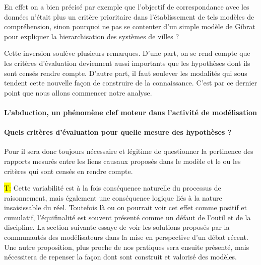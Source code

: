 En effet on a bien précisé par exemple que l'objectif de correspondance avec les données n'était plus un critère prioritaire dans l'établissement de tels modèles de compréhension, sinon pourquoi ne pas se contenter d'un simple modèle de Gibrat pour expliquer la hierarchisation des systèmes de villes ? 


Cette inversion soulève plusieurs remarques. D'une part, on se rend compte que les critères d'évaluation deviennent aussi importants que les hypothèses dont ils sont censés rendre compte. D'autre part, il faut soulever les modalités qui sous tendent cette nouvelle façon de construire de la connaissance. C'est par ce dernier point que nous allons commencer notre analyse.

\paragraph{L'abduction, un phénomène clef moteur dans l'activité de modélisation}
\label{p:abduction}



\paragraph{Quels critères d'évaluation pour quelle mesure des hypothèses ?}
\label{p:critere_evaluation}



Pour \textcite{Bulle2005} il sera donc toujours nécessaire et légitime de questionner la pertinence des rapports mesurés entre les liens causaux proposés dans le modèle et le ou les critères qui sont censés en rendre compte.

\hl{T:} 
Cette variabilité est à la fois conséquence naturelle du processus de raisonnement, mais également une conséquence logique liés à la nature insaisissable du réel. Toutefois là ou on pourrait voir cet effet comme positif et cumulatif, l'équifinalité est souvent présenté comme un défaut de l'outil et de la discipline. La section suivante essaye de voir les solutions proposés par la communautés des modélisateurs dans la mise en perspective d'un débat récent. Une autre proposition, plus proche de nos pratiques sera ensuite présenté, mais nécessitera de repenser la façon dont sont construit et valorisé des modèles. %

